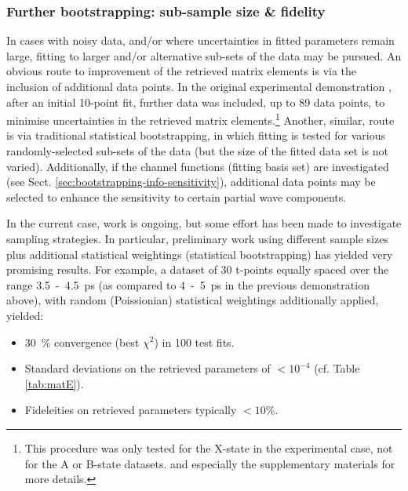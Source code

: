 \documentclass[10pt]{article}
\begin{document}



\subsubsection{Further bootstrapping: sub-sample size \& fidelity}

In cases with noisy data, and/or where uncertainties in fitted parameters remain large, fitting to larger and/or alternative sub-sets of the data may be pursued.
An obvious route to improvement of the retrieved matrix elements is via the inclusion of additional data points. In the original experimental demonstration \cite{marceau2017MolecularFrameReconstruction}, after an initial 10-point fit, further data was included, up to 89 data points, to minimise uncertainties in the retrieved matrix elements.\footnote{This procedure was only tested for the X-state in the experimental case, not for the A or B-state datasets. %
and especially the supplementary materials for more details.} Another, similar, route is via traditional statistical bootstrapping, in which fitting is tested for various randomly-selected sub-sets of the data (but the size of the fitted data set is not varied). Additionally, if the channel functions (fitting basis set) are investigated (see Sect. \ref{sec:bootstrapping-info-sensitivity}), additional data points may be selected to enhance the sensitivity to certain partial wave components.

In the current case, work is ongoing, %
but some effort has been made to investigate sampling strategies. In particular, preliminary work using different sample sizes plus additional statistical weightings (statistical bootstrapping) has yielded very promising results. For example, a dataset of 30 t-points equally spaced over the range 3.5~-~4.5~ps (as compared to 4~-~5~ps in the previous demonstration above), with random (Poissionian) statistical weightings additionally applied, yielded:

\begin{itemize}
\item 30~\% convergence (best $\chi^2$) in 100 test fits.
\item Standard deviations on the retrieved parameters of $<10^{-4}$ (cf. Table \ref{tab:matE}).
\item Fideleities on retrieved parameters typically $<10\%$.
\end{itemize}
\end{document}

